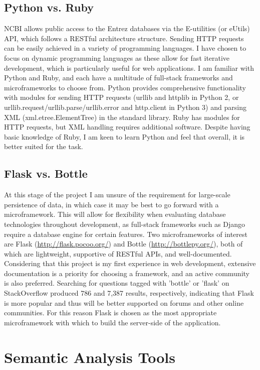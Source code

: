 \documentclass[PROP_AGutteridge_CS.tex]{subfiles}
\begin{document}
\subsection{Python vs. Ruby}
NCBI allows public access to the Entrez databases via the E-utilities (or eUtils) API, which follows a RESTful architecture structure. Sending HTTP requests can be easily achieved in a variety of programming languages. I have chosen to focus on dynamic programming languages as these allow for fast iterative development, which is particularly useful for web applications. I am familiar with Python and Ruby, and each have a multitude of full-stack frameworks and microframeworks to choose from. Python provides comprehensive functionality with modules for sending HTTP requests (urllib and httplib in Python 2, or urllib.request/urllib.parse/urllib.error and http.client in Python 3) and parsing XML (xml.etree.ElementTree) in the standard library. Ruby has modules for HTTP requests, but XML handling requires additional software. Despite having basic knowledge of Ruby, I am keen to learn Python and feel that overall, it is better suited for the task. 

\subsection{Flask vs. Bottle}
At this stage of the project I am unsure of the requirement for large-scale persistence of data, in which case it may be best to go forward with a microframework. This will allow for flexibility when evaluating database technologies throughout development, as full-stack frameworks such as Django require a database engine for certain features. Two microframeworks of interest are Flask (\url{http://flask.pocoo.org/}) and Bottle (\url{http://bottlepy.org/}), both of which are lightweight, supportive of RESTful APIs, and well-documented. Considering that this project is my first experience in web development, extensive documentation is a priority for choosing a framework, and an active community is also preferred. Searching for questions tagged with 'bottle' or 'flask' on StackOverflow produced 786 and 7,387 results, respectively, indicating that Flask is more popular and thus will be better supported on forums and other online communities. For this reason Flask is chosen as the most appropriate microframework with which to build the server-side of the application.\\

\section{Semantic Analysis Tools} 
\end{document}
